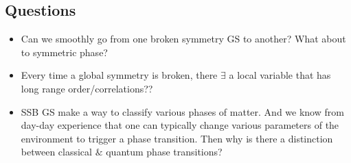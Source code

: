 \documentclass[12pt]{article}
\begin{document}
\newpage
\subsection{Questions}

\begin{itemize}
    \item Can we smoothly go from one broken symmetry GS to another? What about to symmetric phase?
    \item Every time a global symmetry is broken, there $\exists$ a local variable that has long range order/correlations??
    \item SSB GS make a way to classify various phases of matter. And we know from day-day experience that one can typically change various parameters of the environment to trigger a phase transition. Then why is there a distinction between classical $\&$ quantum phase transitions?
\end{itemize}
\end{document}
